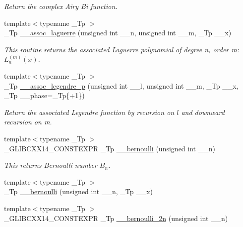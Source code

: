 \begin{DoxyCompactItemize}
\begin{DoxyCompactList}\small\item\em Return the complex Airy Bi function. \end{DoxyCompactList}\item 
{\footnotesize template$<$typename \+\_\+\+Tp $>$ }\\\+\_\+\+Tp \hyperlink{namespacestd_1_1____detail_a7d47c4512f7c6914f5504fde6ffa31fb}{\+\_\+\+\_\+assoc\+\_\+laguerre} (unsigned int \+\_\+\+\_\+n, unsigned int \+\_\+\+\_\+m, \+\_\+\+Tp \+\_\+\+\_\+x)
\begin{DoxyCompactList}\small\item\em This routine returns the associated Laguerre polynomial of degree n, order m\+: $ L_n^{(m)}(x) $. \end{DoxyCompactList}\item 
{\footnotesize template$<$typename \+\_\+\+Tp $>$ }\\\+\_\+\+Tp \hyperlink{namespacestd_1_1____detail_afd2b7e1cb349f144f5527f4f415bc324}{\+\_\+\+\_\+assoc\+\_\+legendre\+\_\+p} (unsigned int \+\_\+\+\_\+l, unsigned int \+\_\+\+\_\+m, \+\_\+\+Tp \+\_\+\+\_\+x, \+\_\+\+Tp \+\_\+\+\_\+phase=\+\_\+\+Tp\{+1\})
\begin{DoxyCompactList}\small\item\em Return the associated Legendre function by recursion on $ l $ and downward recursion on m. \end{DoxyCompactList}\item 
{\footnotesize template$<$typename \+\_\+\+Tp $>$ }\\\+\_\+\+G\+L\+I\+B\+C\+X\+X14\+\_\+\+C\+O\+N\+S\+T\+E\+X\+PR \+\_\+\+Tp \hyperlink{namespacestd_1_1____detail_a68ae2aecb4cdf37b72cd60409cdc500c}{\+\_\+\+\_\+bernoulli} (unsigned int \+\_\+\+\_\+n)
\begin{DoxyCompactList}\small\item\em This returns Bernoulli number $ B_n $. \end{DoxyCompactList}\item 
{\footnotesize template$<$typename \+\_\+\+Tp $>$ }\\\+\_\+\+Tp \hyperlink{namespacestd_1_1____detail_a1171e65b7fb7712f0181fe7288acb343}{\+\_\+\+\_\+bernoulli} (unsigned int \+\_\+\+\_\+n, \+\_\+\+Tp \+\_\+\+\_\+x)
\item 
{\footnotesize template$<$typename \+\_\+\+Tp $>$ }\\\+\_\+\+G\+L\+I\+B\+C\+X\+X14\+\_\+\+C\+O\+N\+S\+T\+E\+X\+PR \+\_\+\+Tp \hyperlink{namespacestd_1_1____detail_abd0b1f05f2b32a21cad034b38473bb8b}{\+\_\+\+\_\+bernoulli\+\_\+2n} (unsigned int \+\_\+\+\_\+n)

\end{DoxyCompactItemize}
